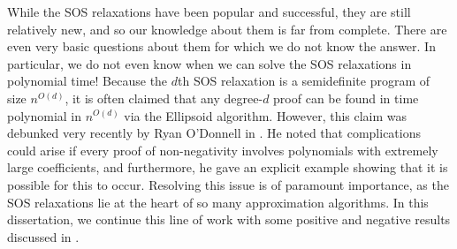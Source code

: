 While the SOS relaxations have been popular and successful, they are still relatively new, and so our knowledge about them is far from complete.
There are even very basic questions about them for which we do not know the answer.
In particular, we do not even know when we can solve the SOS relaxations in polynomial time!
Because the $d$th SOS relaxation is a semidefinite program of size $n^{O(d)}$, it is often claimed that any degree-$d$ proof can be found in time polynomial in $n^{O(d)}$ via the Ellipsoid algorithm. However, this claim was debunked very recently by Ryan O'Donnell in \cite{ODon16}.
He noted that complications could arise if every proof of non-negativity involves polynomials with extremely large coefficients, and furthermore, he gave an explicit example showing that it is possible for this to occur.
Resolving this issue is of paramount importance, as the SOS relaxations lie at the heart of so many approximation algorithms.
In this dissertation, we continue this line of work with some positive and negative results discussed in .

